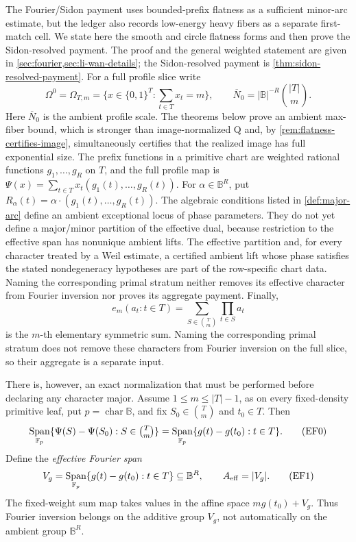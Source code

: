\documentclass[12pt,a4paper]{amsart}
\numberwithin{equation}{section}
\theoremstyle{remark}
\DeclareMathOperator{\Span}{Span}
\newcommand{\F}{\mathbb F}
\newcommand{\B}{\mathbb B}
\newcommand{\barN}{\overline N}
\newcommand{\abs}[1]{\lvert #1\rvert}
\begin{document}
The Fourier/Sidon payment uses bounded-prefix flatness as a sufficient minor-arc estimate, but the ledger also records low-energy heavy fibers as a separate first-match cell.  We state here the smooth and circle flatness forms and then prove the Sidon-resolved payment.  The proof and the general weighted statement are given in \cref{sec:fourier,sec:li-wan-details}; the Sidon-resolved payment is \cref{thm:sidon-resolved-payment}.  For a full profile slice write
\[
        \Omega^0=\Omega_{T,m}=\{x\in\{0,1\}^{T}:\sum_{t\in T}x_t=m\},
        \qquad
        \barN_0=\abs\B^{-R}\binom{\abs T}{m}.
\]
Here \(\barN_0\) is the ambient profile scale.  The theorems below prove
an ambient max-fiber bound, which is stronger than image-normalized Q and,
by \cref{rem:flatness-certifies-image}, simultaneously certifies that the
realized image has full exponential size.
The prefix functions in a primitive chart are weighted rational functions
\(g_1,\ldots,g_R\) on \(T\), and the full profile map is
\(\Psi(x)=\sum_{t\in T}x_t(g_1(t),\ldots,g_R(t))\).  For
\(\alpha\in\B^R\), put
\(R_\alpha(t)=\alpha\cdot(g_1(t),\ldots,g_R(t))\).  The algebraic
conditions listed in \cref{def:major-arc} define an ambient exceptional
locus of phase parameters.  They do not yet define a major/minor partition
of the effective dual, because restriction to the effective span has
nonunique ambient lifts.  The effective partition and, for every character
treated by a Weil estimate, a certified ambient lift whose phase satisfies
the stated nondegeneracy hypotheses are part of the row-specific chart
data.  Naming the corresponding primal stratum neither removes its
effective character from Fourier inversion nor proves its aggregate
payment.  Finally,
\[
 e_m(a_t:t\in T)=\sum_{S\in\binom Tm}\prod_{t\in S}a_t
\]
is the \(m\)-th elementary symmetric sum.  Naming the
corresponding primal stratum does not remove these characters from Fourier
inversion on the full slice, so their aggregate is a separate input.

There is, however, an exact normalization that must be performed before
declaring any character major.  Assume \(1\le m\le\abs T-1\), as on every
fixed-density primitive leaf, put \(p=\operatorname{char}\B\), and fix
\(S_0\in\binom Tm\) and \(t_0\in T\).
Then
\[
 \Span_{\F_p}\{\Psi(S)-\Psi(S_0):S\in\tbinom Tm\}
 =\Span_{\F_p}\{g(t)-g(t_0):t\in T\}.               \tag{EF0}
\]
Define the \emph{effective Fourier span}
\[
 V_g=\Span_{\F_p}\{g(t)-g(t_0):t\in T\}\subseteq\B^R,
 \qquad A_{\rm eff}=\abs{V_g}.
 \tag{EF1}\label{eq:effective-fourier-span}
\]
The fixed-weight sum map takes values in the affine space
\(m g(t_0)+V_g\).  Thus Fourier inversion belongs on the additive group
\(V_g\), not automatically on the ambient group \(\B^R\).
\end{document}
